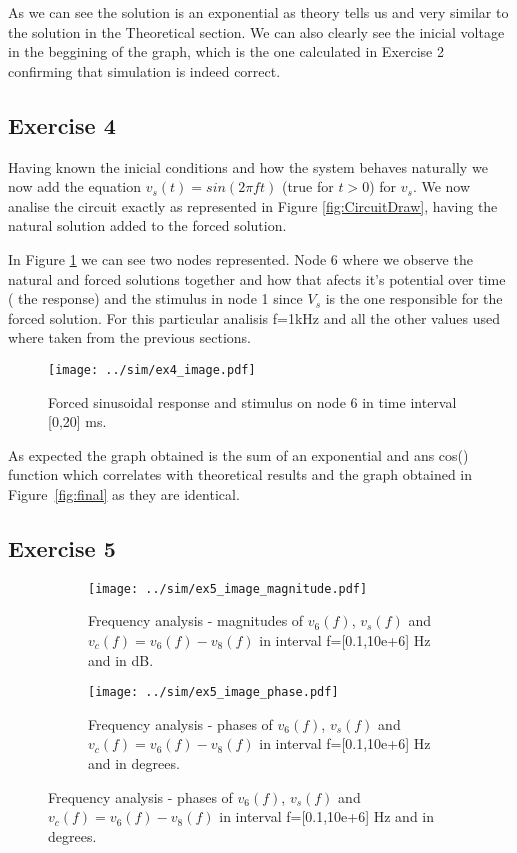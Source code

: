As we can see the solution is an exponential as theory tells us and very similar to the solution in the Theoretical section. We can also clearly see the inicial voltage in the beggining of the graph, which is the one calculated in Exercise 2 confirming that simulation is indeed correct.

\subsection{Exercise 4} \label{sec:Ex4Sim}

Having known the inicial conditions and how the system behaves naturally we now add the equation $v_s(t)=sin(2 \pi f t)$ (true for $t>0$) for $v_s$. We now analise the circuit exactly as represented in Figure \ref{fig:CircuitDraw}, having the natural solution added to the forced solution.\par
In Figure \ref{fig:Ex4_Image} we can see two nodes represented. Node 6 where we observe the natural and forced solutions together and how that afects it's potential over time ( the response) and the stimulus in node 1 since $V_s$ is the one responsible for the forced solution. For this particular analisis f=1kHz and all the other values used where taken from the previous sections. 

\begin{figure}[H]
  \centering
  \texttt{[image: ../sim/ex4\_image.pdf]}
  \caption{Forced sinusoidal response and stimulus on node 6 in time interval [0,20] ms.}
  \label{fig:Ex4_Image}
\end{figure}


As expected the graph obtained is the sum of an exponential and ans cos() function which correlates with theoretical results and the graph obtained in Figure~\ref{fig:final} as they are identical.

\subsection{Exercise 5} \label{sec:Ex5Sim}
 \begin{figure}[H]
 \footnotesize
\begin{subfigure}{.49\linewidth}
 \footnotesize
  \centering
  \texttt{[image: ../sim/ex5\_image\_magnitude.pdf]}
   \footnotesize
\caption{Frequency analysis - magnitudes of $v_6(f)$, $v_s(f)$ and $v_c(f)=v_6(f)-v_8(f)$ in interval f=[0.1,10e+6] Hz and in dB.}
\label{fig:Ex5_Image_Magnitude}
\end{subfigure}
\hspace{5mm}
\begin{subfigure}{.49\linewidth}
  \centering
  \texttt{[image: ../sim/ex5\_image\_phase.pdf]}  
\caption{Frequency analysis - phases of $v_6(f)$, $v_s(f)$ and $v_c(f)=v_6(f)-v_8(f)$ in interval f=[0.1,10e+6] Hz and in degrees.}
\label{fig:Ex5_Image_Phase}
\end{subfigure}
\end{figure} 


